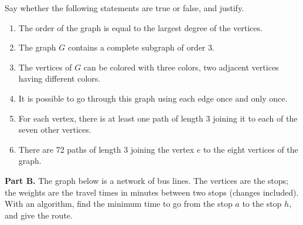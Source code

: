 Say whether the following statements are true or false, and justify.
\begin{enumerate}
\item The order of the graph is equal to the largest degree of the vertices.
\item The graph $G$ contains a complete subgraph of order 3.
\item The vertices of $G$ can be colored with three colors, two adjacent
      vertices having different colors.
\item It is possible to go through this graph using each edge once and only
      once.
\item For each vertex, there is at least one path of length 3 joining it to
      each of the seven other vertices.
\item There are 72 paths of length 3 joining the vertex $e$ to the eight
      vertices of the graph.
\end{enumerate}

\textbf{Part B.} The graph below is a network of bus lines. The vertices are
the stops; the weights are the travel times in minutes between two stops
(changes included). With an algorithm, find the minimum time to go from the
stop $a$ to the stop $h$, and give the route.

\begin{center}
\end{center}

\begin{tkzexample}
\end{tkzexample}

